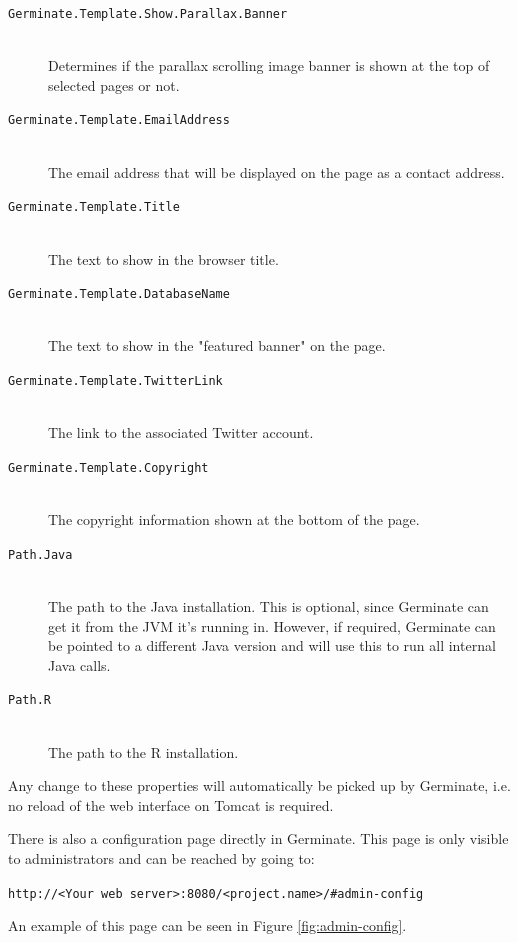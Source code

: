 \begin{description}
    \item[\texttt{Germinate.Template.Show.Parallax.Banner}] \\Determines if the parallax scrolling image banner is shown at the top of selected pages or not.
    \item[\texttt{Germinate.Template.EmailAddress}] \floatright{[E-Mail]}\\The email address that will be displayed on the page as a contact address.    
    \item[\texttt{Germinate.Template.Title}] \floatright{[String]}\\The text to show in the browser title.
    \item[\texttt{Germinate.Template.DatabaseName}] \floatright{[String]}\\The text to show in the "featured banner" on the page.
    \item[\texttt{Germinate.Template.TwitterLink}] \floatright{[URL]}\\The link to the associated Twitter account.
    \item[\texttt{Germinate.Template.Copyright}] \floatright{[String]}\\The copyright information shown at the bottom of the page.
    \item[\texttt{Path.Java}] \floatright{[String]}\\The path to the Java installation. This is optional, since Germinate can get it from the JVM it's running in. However, if required, Germinate can be pointed to a different Java version and will use this to run all internal Java calls.
    \item[\texttt{Path.R}\nonoptionalif] \floatright{[String]}\\The path to the R installation.
\end{description}
\noindent
Any change to these properties will automatically be picked up by Germinate, i.e. no reload of the web interface on Tomcat is required.

There is also a configuration page directly in Germinate. This page is only visible to administrators and can be reached by going to:
\begin{center}
	\texttt{http://<Your web server>:8080/<project.name>/\#admin-config}
\end{center}
\noindent An example of this page can be seen in Figure \ref{fig:admin-config}.

